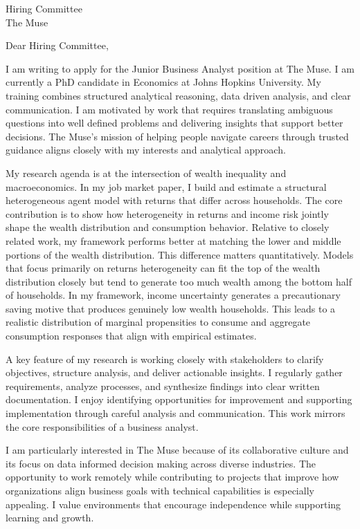 \documentclass[11pt]{letter}
\begin{document}
\begin{letter}{Hiring Committee \\ The Muse}

\opening{Dear Hiring Committee,}

I am writing to apply for the Junior Business Analyst position at The Muse. I am currently a PhD candidate in Economics at Johns Hopkins University. My training combines structured analytical reasoning, data driven analysis, and clear communication. I am motivated by work that requires translating ambiguous questions into well defined problems and delivering insights that support better decisions. The Muse’s mission of helping people navigate careers through trusted guidance aligns closely with my interests and analytical approach.

My research agenda is at the intersection of wealth inequality and macroeconomics. In my job market paper, I build and estimate a structural heterogeneous agent model with returns that differ across households. The core contribution is to show how heterogeneity in returns and income risk jointly shape the wealth distribution and consumption behavior. Relative to closely related work, my framework performs better at matching the lower and middle portions of the wealth distribution. This difference matters quantitatively. Models that focus primarily on returns heterogeneity can fit the top of the wealth distribution closely but tend to generate too much wealth among the bottom half of households. In my framework, income uncertainty generates a precautionary saving motive that produces genuinely low wealth households. This leads to a realistic distribution of marginal propensities to consume and aggregate consumption responses that align with empirical estimates.

A key feature of my research is working closely with stakeholders to clarify objectives, structure analysis, and deliver actionable insights. I regularly gather requirements, analyze processes, and synthesize findings into clear written documentation. I enjoy identifying opportunities for improvement and supporting implementation through careful analysis and communication. This work mirrors the core responsibilities of a business analyst.

I am particularly interested in The Muse because of its collaborative culture and its focus on data informed decision making across diverse industries. The opportunity to work remotely while contributing to projects that improve how organizations align business goals with technical capabilities is especially appealing. I value environments that encourage independence while supporting learning and growth.


\end{letter}
\end{document}
